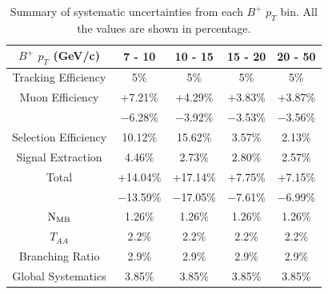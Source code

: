 \begin{table}[h]
\begin{center}
\caption{Summary of systematic uncertainties from each $B^+$ $p_T$ bin. All the values are shown in percentage.}
\vspace{1em}
\label{BPPtSystSum}
\begin{tabular}{ |c | c | c | c | c|}
\hline
$B^+$ $p_T$ (GeV/c) &  7 - 10 & 10 - 15 & 15 - 20 & 20 - 50  \\
\hline
Tracking Efficiency & 5\% & 5\% & 5\% & 5\% \\
Muon Efficiency     & +7.21\% & +4.29\% & +3.83\% & +3.87\% \\
                                & $-$6.28\% & $-$3.92\% & $-$3.53\% & $-$3.56\% \\
Selection Efficiency & 10.12\%  & 15.62\%  & 3.57\% & 2.13\%  \\
Signal Extraction & 4.46\%  & 2.73\% & 2.80\%  & 2.57\% \\
Total  & +14.04\% &  +17.14\% &  +7.75\% & +7.15\%  \\
      	 & $-$13.59\% &  $-$17.05\% &  $-$7.61\% &  $-$6.99\%  \\
\hline
 \hline
$\rm{N_{MB}} $ & 1.26\% & 1.26\% & 1.26\% & 1.26\% \\
$T_{AA}$ & 2.2\% & 2.2\% & 2.2\% & 2.2\% \\
Branching Ratio & 2.9\% & 2.9\% & 2.9\%& 2.9\%\\
Global Systematics & 3.85\% & 3.85\% & 3.85\%& 3.85\%\\
 \hline
\end{tabular}
\end{center}
\end{table}


